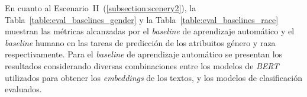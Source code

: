 \begin{table}[htpb]
    \centering
    \caption{Resumen de m\'etricas de concordancia entre \emph{ChatGPT} y el corpus final.}
    \label{table:agreement_gpt}
\end{table}

En cuanto al Escenario~II~(\ref{subsection:scenery2}), la Tabla~\ref{table:eval_baselines_gender} y la Tabla~\ref{table:eval_baselines_race}
muestran las m\'etricas alcanzadas por el \emph{baseline} de aprendizaje autom\'atico y el \emph{baseline} humano en las tareas de 
predicci\'on de los atribuitos g\'enero y raza respectivamente. Para el \emph{baseline} de aprendizaje autom\'atico se presentan 
los resultados considerando diversas combinaciones entre los modelos de \emph{BERT} utilizados para obtener los 
\emph{embeddings} de los textos, y los modelos de clasificaci\'on evaluados. 


